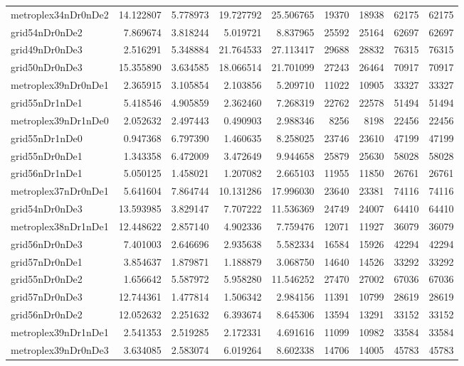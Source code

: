 \begin{longtable}{|l|r|r|r|r|r|r|r|r|}
metroplex34nDr0nDe2 & 14.122807 & 5.778973 & 19.727792 & 25.506765 & 19370 & 18938 & 62175 & 62175 \\
grid54nDr0nDe2 & 7.869674 & 3.818244 & 5.019721 & 8.837965 & 25592 & 25164 & 62697 & 62697 \\
grid49nDr0nDe3 & 2.516291 & 5.348884 & 21.764533 & 27.113417 & 29688 & 28832 & 76315 & 76315 \\
grid50nDr0nDe3 & 15.355890 & 3.634585 & 18.066514 & 21.701099 & 27243 & 26464 & 70917 & 70917 \\
metroplex39nDr0nDe1 & 2.365915 & 3.105854 & 2.103856 & 5.209710 & 11022 & 10905 & 33327 & 33327 \\
grid55nDr1nDe1 & 5.418546 & 4.905859 & 2.362460 & 7.268319 & 22762 & 22578 & 51494 & 51494 \\
metroplex39nDr1nDe0 & 2.052632 & 2.497443 & 0.490903 & 2.988346 & 8256 & 8198 & 22456 & 22456 \\
grid55nDr1nDe0 & 0.947368 & 6.797390 & 1.460635 & 8.258025 & 23746 & 23610 & 47199 & 47199 \\
grid55nDr0nDe1 & 1.343358 & 6.472009 & 3.472649 & 9.944658 & 25879 & 25630 & 58028 & 58028 \\
grid56nDr1nDe1 & 5.050125 & 1.458021 & 1.207082 & 2.665103 & 11955 & 11850 & 26761 & 26761 \\
metroplex37nDr0nDe1 & 5.641604 & 7.864744 & 10.131286 & 17.996030 & 23640 & 23381 & 74116 & 74116 \\
grid54nDr0nDe3 & 13.593985 & 3.829147 & 7.707222 & 11.536369 & 24749 & 24007 & 64410 & 64410 \\
metroplex38nDr1nDe1 & 12.448622 & 2.857140 & 4.902336 & 7.759476 & 12071 & 11927 & 36079 & 36079 \\
grid56nDr0nDe3 & 7.401003 & 2.646696 & 2.935638 & 5.582334 & 16584 & 15926 & 42294 & 42294 \\
grid57nDr0nDe1 & 3.854637 & 1.879871 & 1.188879 & 3.068750 & 14640 & 14526 & 33292 & 33292 \\
grid55nDr0nDe2 & 1.656642 & 5.587972 & 5.958280 & 11.546252 & 27470 & 27002 & 67036 & 67036 \\
grid57nDr0nDe3 & 12.744361 & 1.477814 & 1.506342 & 2.984156 & 11391 & 10799 & 28619 & 28619 \\
grid56nDr0nDe2 & 12.052632 & 2.251632 & 6.393674 & 8.645306 & 13594 & 13291 & 33152 & 33152 \\
metroplex39nDr1nDe1 & 2.541353 & 2.519285 & 2.172331 & 4.691616 & 11099 & 10982 & 33584 & 33584 \\
metroplex39nDr0nDe3 & 3.634085 & 2.583074 & 6.019264 & 8.602338 & 14706 & 14005 & 45783 & 45783 \\

\end{longtable}
